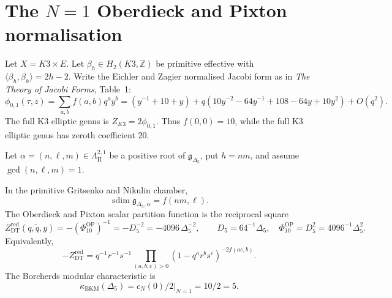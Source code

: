 \section{The \texorpdfstring{$N=1$}{N=1} Oberdieck and Pixton normalisation}
\label{wn:sec:lorgat-conj1-N1-OP-normalization}

\providecommand{\phiZero}{\phi_{0,1}}
\providecommand{\gDelta}{\mathfrak{g}_{\Delta_5}}
\providecommand{\ZDTred}{Z^{\mathrm{red}}_{\mathrm{DT}}}
\providecommand{\Dfive}{D_5}
\providecommand{\PhiOP}{\Phi_{10}^{\mathrm{OP}}}

Let \(X=K3\times E\).  Let
\(\beta_h\in H_2(K3,\mathbb Z)\) be primitive effective with
\(\langle\beta_h,\beta_h\rangle=2h-2\).  Write the Eichler and Zagier
normalised Jacobi form as in \emph{The Theory of Jacobi Forms},
Table~1:
\[
  \phiZero(\tau,z)=\sum_{a,b} f(a,b)q^a y^b
  =
  (y^{-1}+10+y)
  +
  q(10y^{-2}-64y^{-1}+108-64y+10y^2)+O(q^2).
\]
The full K3 elliptic genus is \(Z_{K3}=2\phiZero\).  Thus \(f(0,0)=10\),
while the full K3 elliptic genus has zeroth coefficient \(20\).

Let \(\alpha=(n,\ell,m)\in\Lambda^{2,1}_{\mathrm{II}}\) be a positive
root of \(\gDelta\), put \(h=nm\), and assume \(\gcd(n,\ell,m)=1\).

\begin{theorem}
\label{thm:lorgat-conj1-N1-OP-normalization}
In the primitive Gritsenko and Nikulin chamber,
\[
  \operatorname{sdim}\mathfrak g_{\Delta_5,\alpha}=f(nm,\ell).
\]
The Oberdieck and Pixton scalar partition function is the reciprocal
square
\[
  \ZDTred(q,\tilde q,y)
  =
  -(\PhiOP)^{-1}
  =
  -\Dfive^{-2}
  =
  -4096\,\Delta_5^{-2},
  \qquad
  \Dfive=64^{-1}\Delta_5,\quad
  \PhiOP=\Dfive^2=4096^{-1}\Delta_5^2.
\]
Equivalently,
\[
  -\ZDTred
  =
  q^{-1}r^{-1}s^{-1}
  \prod_{(a,b,c)>0}(1-q^ar^b s^c)^{-2f(ac,b)} .
\]
The Borcherds modular characteristic is
\[
  \kappa_{\mathrm{BKM}}(\Delta_5)
  =
  \left.c_N(0)/2\right|_{N=1}
  =
  10/2
  =
  5 .
\]
\end{theorem}

